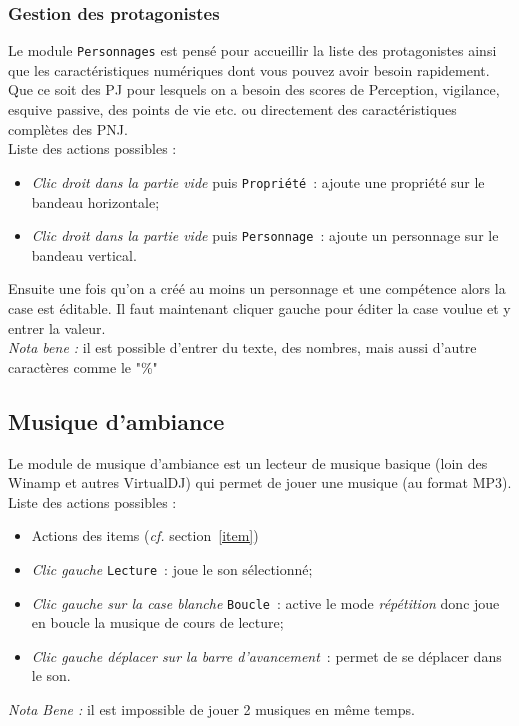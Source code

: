 \documentclass[a4paper,12pt]{article}
\newcommand*{\interfaceitem}[1]{\texttt{#1}}
\begin{document}
\subsubsection{Gestion des protagonistes}\label{personnage}
Le module \interfaceitem{Personnages} est pensé pour accueillir la liste des protagonistes ainsi que les caractéristiques numériques dont vous pouvez avoir besoin rapidement. Que ce soit des PJ pour lesquels on a besoin des scores de Perception, vigilance, esquive passive, des points de vie etc. ou directement des caractéristiques complètes des PNJ.
\\
Liste des actions possibles :
\begin{itemize}
    \item \emph{Clic droit dans la partie vide} puis \interfaceitem{Propriété}~: ajoute une propriété sur le bandeau horizontale;
    \item \emph{Clic droit dans la partie vide} puis \interfaceitem{Personnage}~: ajoute un personnage sur le bandeau vertical.
\end{itemize}
Ensuite une fois qu'on a créé au moins un personnage et une compétence alors la case est éditable. Il faut maintenant cliquer gauche pour éditer la case voulue et y entrer la valeur.
\\\emph{Nota bene :} il est possible d'entrer du texte, des nombres, mais aussi d'autre caractères comme le "\%"

\subsection{Musique d'ambiance}\label{musique}
Le module de musique d'ambiance est un lecteur de musique basique (loin des Winamp et autres VirtualDJ) qui permet de jouer une musique (au format MP3).
\\
Liste des actions possibles :
\begin{itemize}
    \item Actions des items (\emph{cf.} section~\ref{item})
    \item \emph{Clic gauche} \interfaceitem{Lecture}~: joue le son sélectionné;
    \item \emph{Clic gauche sur la case blanche} \interfaceitem{Boucle}~: active le mode \emph{répétition} donc joue en boucle la musique de cours de lecture;
    \item \emph{Clic gauche déplacer sur la barre d'avancement}~: permet de se déplacer dans le son.
\end{itemize}
\emph{Nota Bene :} il est impossible de jouer 2 musiques en même temps.
\end{document}
